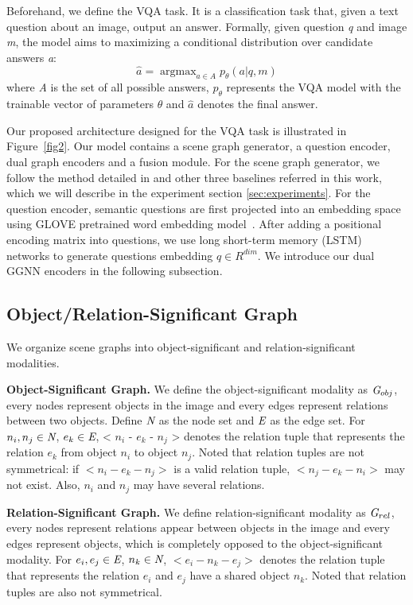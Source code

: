 \documentclass[letterpaper]{article} %
\begin{document}
Beforehand, we define the VQA task. 
It is a classification task that, given a text question about an image, output an answer. 
Formally, given question \emph{q} and image \emph{m}, the model aims to maximizing a conditional distribution over candidate answers \emph{a}:
\begin{equation}
    \hat{a} = \mathop{\arg\max}_{a \in A}p_\theta(a|q, m)
\end{equation}
where \emph{A} is the set of all possible answers, $p_\theta$ represents the VQA model with the trainable vector of parameters $\theta$ and $\hat{a}$ denotes the final answer.

Our proposed architecture designed for the VQA task is illustrated in Figure~\ref{fig2}. 
Our model contains a scene graph generator, a question encoder, dual graph encoders and a fusion module. For the scene graph generator, we follow the method detailed in \cite{tang2020sggcode} and other three baselines referred in this work, which we will describe in the experiment section \ref{sec:experiments}. 
For the question encoder, semantic questions are first projected into an embedding space using GLOVE pretrained word embedding model~\cite{pennington-etal-2014-glove}. 
After adding a positional encoding matrix into questions, we use long short-term memory (LSTM) networks to generate questions embedding $q \in R^{dim}$. 
We introduce our dual GGNN encoders in the following subsection.

\subsection{Object/Relation-Significant Graph}
We organize scene graphs into object-significant and relation-significant modalities. 

\medskip
\textbf{Object-Significant Graph.} We define the object-significant modality as $\emph{G}_{obj}$, every nodes represent objects in the image and every edges represent relations between two objects. Define $\emph{N}$ as the node set and $\emph{E}$ as the edge set. For $n_i, n_j \in \emph{N}$, $e_k \in \emph{E}$, < $n_i$ - $e_k$ - $n_j$ > denotes the relation tuple that represents the relation $e_k$ from object $n_i$ to object $n_j$. Noted that relation tuples are not symmetrical: if $<n_i - e_k - n_j>$ is a valid relation tuple,  $<n_j - e_k - n_i>$ may not exist. Also, $n_i$ and $n_j$ may have several relations. 

\medskip
\textbf{Relation-Significant Graph.} We define relation-significant modality as $\emph{G}_{rel}$, every nodes represent relations appear between objects in the image and every edges represent objects, which is completely opposed to the object-significant modality. For $e_i, e_j \in \emph{E}$, $n_k \in \emph{N}$, $<e_i - n_k - e_j>$ denotes the relation tuple that represents the relation $e_i$ and $e_j$ have a shared object $n_k$. Noted that relation tuples are also not symmetrical.
\end{document}
